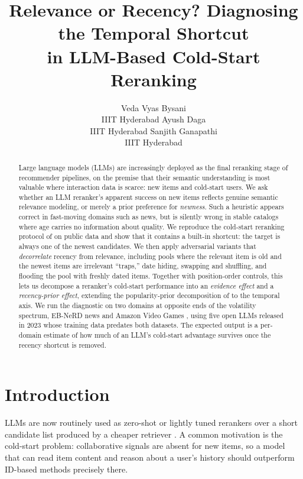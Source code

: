 \documentclass[11pt]{article}
\title{Relevance or Recency? Diagnosing the Temporal Shortcut\\
in LLM-Based Cold-Start Reranking}
\author{
  Veda Vyas Bysani \\ IIIT Hyderabad \And
  Ayush Daga \\ IIIT Hyderabad \And
  Sanjith Ganapathi \\ IIIT Hyderabad
}
\begin{document}
\maketitle

\begin{abstract}
Large language models (LLMs) are increasingly deployed as the final reranking stage of recommender pipelines, on the premise that their semantic understanding is most valuable where interaction data is scarce: new items and cold-start users. We ask whether an LLM reranker's apparent success on new items reflects genuine semantic relevance modeling, or merely a prior preference for \emph{newness}. Such a heuristic appears correct in fast-moving domains such as news, but is silently wrong in stable catalogs where age carries no information about quality. We reproduce the cold-start reranking protocol of \citet{li2026llmreasoning} on public data and show that it contains a built-in shortcut: the target is always one of the newest candidates. We then apply adversarial variants that \emph{decorrelate} recency from relevance, including pools where the relevant item is old and the newest items are irrelevant ``traps,'' date hiding, swapping and shuffling, and flooding the pool with freshly dated items. Together with position-order controls, this lets us decompose a reranker's cold-start performance into an \emph{evidence effect} and a \emph{recency-prior effect}, extending the popularity-prior decomposition of \citet{dong2026diagnosing} to the temporal axis. We run the diagnostic on two domains at opposite ends of the volatility spectrum, EB-NeRD news \citep{kruse2024ebnerd} and Amazon Video Games \citep{hou2024bridging}, using five open LLMs released in 2023 whose training data predates both datasets. The expected output is a per-domain estimate of how much of an LLM's cold-start advantage survives once the recency shortcut is removed.
\end{abstract}

\section{Introduction}

LLMs are now routinely used as zero-shot or lightly tuned rerankers over a short candidate list produced by a cheaper retriever \citep{sun2023rankgpt, hou2024llmrank}. A common motivation is the cold-start problem: collaborative signals are absent for new items, so a model that can read item content and reason about a user's history should outperform ID-based methods precisely there.
\end{document}

